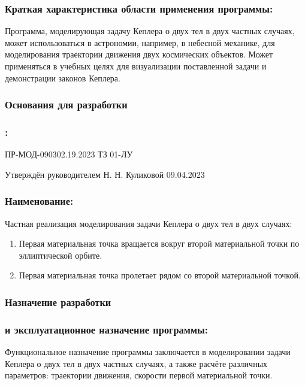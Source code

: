  \subsubsection*{Краткая характеристика области применения программы:}
 Программа, моделирующая задачу Кеплера о двух тел в двух частных случаях, может использоваться в астрономии, например, в небесной механике, для моделирования траектории движения двух космических объектов. Может применяться в учебных целях для визуализации поставленной задачи и демонстрации законов Кеплера.\newline
 \begin{center}\subsubsection*{Основания для разработки}\end{center}

 \subsubsection*{:}
 ПР-МОД-090302.19.2023 ТЗ 01-ЛУ

 Утверждён руководителем Н. Н. Куликовой 09.04.2023
 \subsubsection*{Наименование:}
 Частная реализация моделирования задачи Кеплера о двух тел в двух случаях:
 \begin{enumerate}
  \item Первая материальная точка вращается вокруг второй материальной точки по эллиптической орбите.
  \item Первая материальная точка пролетает рядом со второй материальной точкой.\newline
 \end{enumerate}
 \begin{center}\subsubsection*{Назначение разработки}\end{center}

 \subsubsection*{ и эксплуатационное назначение программы:}
 Функциональное назначение программы заключается в моделировании задачи Кеплера о двух тел в двух частных случаях, а также расчёте различных параметров: траектории движения, скорости первой материальной точки.

